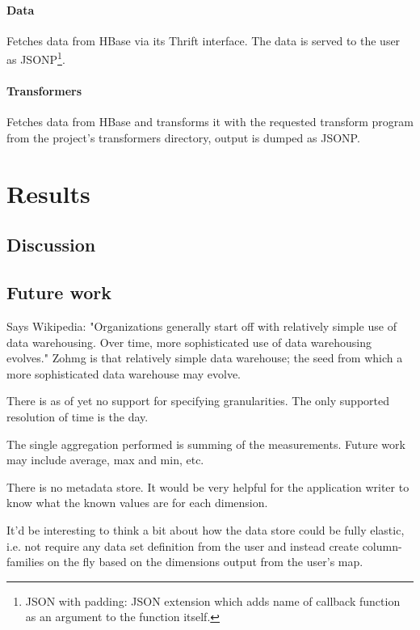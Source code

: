 \subsubsection{Data}

Fetches data from HBase via its Thrift interface. The data is served to the
user as JSONP\footnote{JSON with padding: JSON extension which adds name of
callback function as an argument to the function itself.}.


\subsubsection{Transformers}

Fetches data from HBase and transforms it with the requested transform
program from the project's transformers directory, output is
dumped as JSONP.



\chapter{Results}



\section{Discussion}



\section{Future work}

Says Wikipedia: "Organizations generally start off with relatively simple use
of data warehousing. Over time, more sophisticated use of data warehousing
evolves." Zohmg is that relatively simple data warehouse; the seed from which
a more sophisticated data warehouse may evolve.

There is as of yet no support for specifying granularities. The only supported
resolution of time is the day.

The single aggregation performed is summing of the measurements. Future work
may include average, max and min, etc.

There is no metadata store. It would be very helpful for the application
writer to know what the known values are for each dimension.

It'd be interesting to think a bit about how the data store could be fully
elastic, i.e. not require any data set definition from the user and instead
create column-families on the fly based on the dimensions output from the
user's map.


